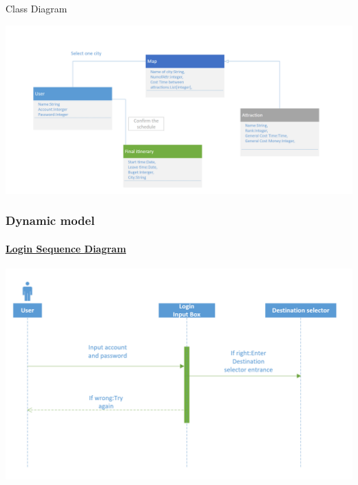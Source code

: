 \documentclass[10pt]{article}
\begin{document}
\begin{center}
	{\Large Class Diagram}

	\includegraphics[width=14cm]{2.png} 
\end{center}

\subsubsection{Dynamic model}
\paragraph{\underline{Login Sequence Diagram}}
	\begin{center}

	
		\includegraphics[width=14cm]{3.png} 
	\end{center}
\end{document}
